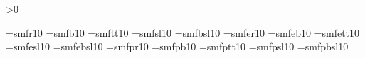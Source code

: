 
\newif\ifPDF
\ifx\pdfoutput\undefined\else\ifnum\pdfoutput>0 \expandafter\PDFtrue\fi\fi

\ifPDF
  \pdfmapfile{+semaf.map}
\fi

\font\smfr=smfr10
\font\smfbf=smfb10    %
\font\smftt=smftt10
\font\smfsl=smfsl10
\font\smfbsl=smfbsl10
\font\smfer=smfer10
\font\smfebf=smfeb10  %
\font\smfett=smfett10
\font\smfesl=smfesl10
\font\smfebsl=smfebsl10
\font\smfpr=smfpr10
\font\smfpbf=smfpb10
\font\smfptt=smfptt10
\font\smfpsl=smfpsl10
\font\smfpbsl=smfpbsl10

\endinput